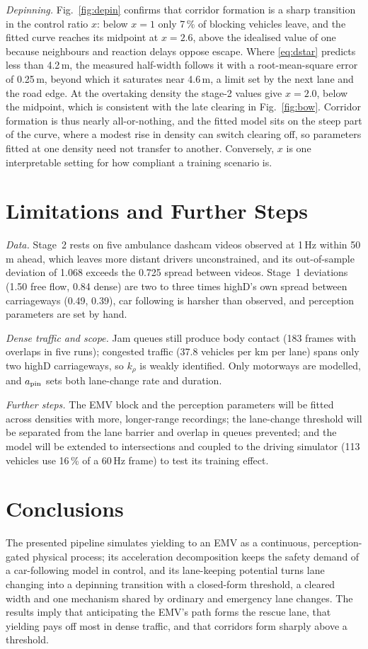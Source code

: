 \documentclass[conference,a4paper]{IEEEtran}
\begin{document}
\emph{Depinning.} Fig.~\ref{fig:depin} confirms that corridor formation is a sharp transition in the control ratio $x$: below $x=1$ only 7\,\% of blocking vehicles leave, and the fitted curve reaches its midpoint at $x=2.6$, above the idealised value of one because neighbours and reaction delays oppose escape. Where \eqref{eq:dstar} predicts less than 4.2\,m, the measured half-width follows it with a root-mean-square error of 0.25\,m, beyond which it saturates near 4.6\,m, a limit set by the next lane and the road edge. At the overtaking density the stage-2 values give $x=2.0$, below the midpoint, which is consistent with the late clearing in Fig.~\ref{fig:bow}. Corridor formation is thus nearly all-or-nothing, and the fitted model sits on the steep part of the curve, where a modest rise in density can switch clearing off, so parameters fitted at one density need not transfer to another. Conversely, $x$ is one interpretable setting for how compliant a training scenario is.

\section{Limitations and Further Steps}
\emph{Data.} Stage~2 rests on five ambulance dashcam videos observed at 1\,Hz within 50\,m ahead, which leaves more distant drivers unconstrained, and its out-of-sample deviation of 1.068 exceeds the 0.725 spread between videos. Stage~1 deviations (1.50 free flow, 0.84 dense) are two to three times highD's own spread between carriageways (0.49, 0.39), car following is harsher than observed, and perception parameters are set by hand.

\emph{Dense traffic and scope.} Jam queues still produce body contact (183 frames with overlaps in five runs); congested traffic (37.8 vehicles per km per lane) spans only two highD carriageways, so $k_\rho$ is weakly identified. Only motorways are modelled, and $a_{\rm pin}$ sets both lane-change rate and duration.

\emph{Further steps.} The EMV block and the perception parameters will be fitted across densities with more, longer-range recordings; the lane-change threshold will be separated from the lane barrier and overlap in queues prevented; and the model will be extended to intersections and coupled to the driving simulator (113 vehicles use 16\,\% of a 60\,Hz frame) to test its training effect.

\section{Conclusions}
The presented pipeline simulates yielding to an EMV as a continuous, perception-gated physical process; its acceleration decomposition keeps the safety demand of a car-following model in control, and its lane-keeping potential turns lane changing into a depinning transition with a closed-form threshold, a cleared width and one mechanism shared by ordinary and emergency lane changes. The results imply that anticipating the EMV's path forms the rescue lane, that yielding pays off most in dense traffic, and that corridors form sharply above a threshold.
\end{document}
